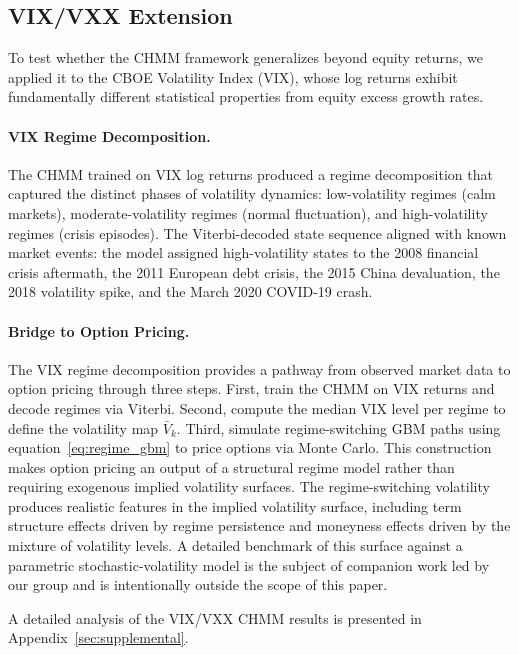 \subsection{VIX/VXX Extension}
\label{sec:vix_results}

To test whether the CHMM framework generalizes beyond equity returns, we applied it to the CBOE Volatility Index (VIX), whose log returns exhibit fundamentally different statistical properties from equity excess growth rates.

\paragraph{VIX Regime Decomposition.}
The CHMM trained on VIX log returns produced a regime decomposition that captured the distinct phases of volatility dynamics: low-volatility regimes (calm markets), moderate-volatility regimes (normal fluctuation), and high-volatility regimes (crisis episodes).
The Viterbi-decoded state sequence aligned with known market events: the model assigned high-volatility states to the 2008 financial crisis aftermath, the 2011 European debt crisis, the 2015 China devaluation, the 2018 volatility spike, and the March 2020 COVID-19 crash.

\paragraph{Bridge to Option Pricing.}
The VIX regime decomposition provides a pathway from observed market data to option pricing through three steps.
First, train the CHMM on VIX returns and decode regimes via Viterbi.
Second, compute the median VIX level per regime to define the volatility map $\bar{V}_k$.
Third, simulate regime-switching GBM paths using equation~\eqref{eq:regime_gbm} to price options via Monte Carlo.
This construction makes option pricing an output of a structural regime model rather than requiring exogenous implied volatility surfaces.
The regime-switching volatility produces realistic features in the implied volatility surface, including term structure effects driven by regime persistence and moneyness effects driven by the mixture of volatility levels.
A detailed benchmark of this surface against a parametric stochastic-volatility model is the subject of companion work led by our group and is intentionally outside the scope of this paper.

A detailed analysis of the VIX/VXX CHMM results is presented in Appendix~\ref{sec:supplemental}.
